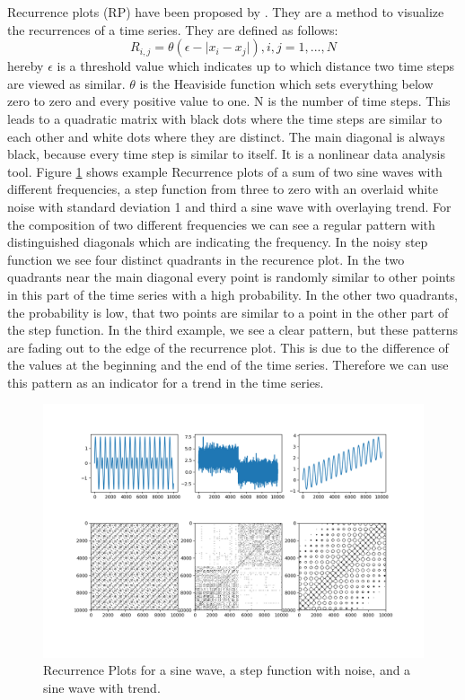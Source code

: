 \documentclass{article}
\begin{document}
Recurrence plots (RP) have been proposed by \cite{Eckmann1987}. They are a method to visualize the recurrences of a time series.
They are defined as follows:
$$R_{i,j} = \theta(\epsilon - \lvert x_i - x_j \rvert), i,j = 1,...,N$$
hereby $\epsilon$ is a threshold value which indicates up to which distance two time steps are viewed as similar.
$\theta$ is the Heaviside function which sets everything below zero to zero and every positive value to one.
N is the number of time steps.
This leads to a quadratic matrix with black dots where the time steps are similar to each other and white dots where they are distinct.
The main diagonal is always black, because every time step is similar to itself.
It is a nonlinear data analysis tool.
Figure \ref{rplots} shows example Recurrence plots of a sum of two sine waves with different frequencies,
a step function from three to zero with an overlaid white noise with standard deviation 1 and third a sine wave with overlaying trend.
For the composition of two different frequencies we can see a regular pattern with distinguished diagonals which are indicating the frequency.
In the noisy step function we see four distinct quadrants in the recurence plot.
In the two quadrants near the main diagonal every point is randomly similar to other points in this part of the time series with a high probability.
In the other two quadrants, the probability is low, that two points are similar to a point in the other part of the step function.
In the third example, we see a clear pattern, but these patterns are fading out to the edge of the recurrence plot.
This is due to the difference of the values at the beginning and the end of the time series.
Therefore we can use this pattern as an indicator for a trend in the time series.

\begin{figure}
  \includegraphics[width=\textwidth]{figs/rp_methods.png}
  \caption{Recurrence Plots for a sine wave, a step function with noise, and a sine wave with trend.}
  \label{rplots}
\end{figure}
\end{document}
